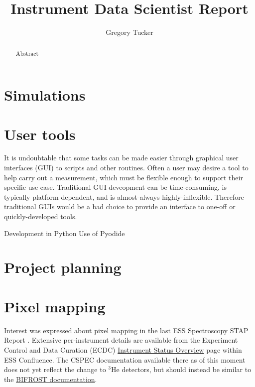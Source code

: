 \documentclass[a4paper, twocolumn, 10pt, revision]{ess}
\newcommand{\pdfsubject}{Spectroscopy Scientific and Technical Advisory Panel}
\newcommand{\pdftitle}{Instrument Data Scientist Report}
\newcommand{\pdfauthor}{Gregory Tucker}
\begin{document}
\titlehead{\pdfsubject \hfill Revision: \revision}
\title{\pdftitle}
\author{\pdfauthor}
\date{\revisiondate}
\maketitle

\begin{abstract}
  Abstract
\end{abstract}

\section{Simulations}

\section{User tools}
It is undoubtable that some tasks can be made easier through graphical user interfaces (GUI) to scripts and other routines.
Often a user may desire a tool to help carry out a measurement, which must be flexible enough to support their specific use case.
Traditional GUI deveopment can be time-consuming, is typically platform dependent, and is almost-always highly-inflexible.
Therefore traditional GUIs would be a bad choice to provide an interface to one-off or quickly-developed tools.

Development in Python
Use of Pyodide


\section{Project planning}



\section{Pixel mapping}
Interest was expressed about pixel mapping in the last ESS Spectroscopy STAP Report \autocite{spectroscopy_stap_2022}.
Extensive per-instrument details are available from the Experiment Control and Data Curation (ECDC)
\href{https://confluence.esss.lu.se/display/ECDC/Instrument+Status+Overview}{Instrument Status Overview} page within 
ESS Confluence.
The CSPEC documentation available there as of this moment does not yet reflect the change to $^3$He detectors,
but should instead be similar to the \href{https://project.esss.dk/owncloud/index.php/s/4M60TNdqkMcppUX}{BIFROST documentation}.
\end{document}
